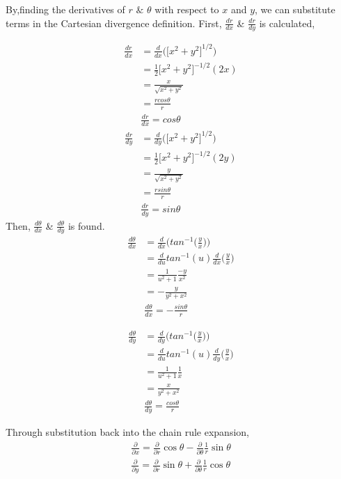 By,finding the derivatives of $r$ $\&$ $\theta$ with respect to $x$ and $y$, we can substitute terms in the Cartesian divergence definition. First, $\frac{dr}{dx}$ \& $\frac{dr}{dy}$ is calculated,

\begin{align*}
 	\frac{dr}{dx}                                      
	&= \frac{d}{dx} \Bigg(\Big[ x^2 + y^2 \Big]^{1/2}\Bigg) \\
	&= \frac{1}{2} \Big[ x^2 + y^2 \Big]^{-1/2} (2x) \\
 	&=	\frac{x}{\sqrt{x^2+y^2}}\\
 	&= \frac{r cos\theta}{r}\\
 	& \boxed{\frac{dr}{dx} = cos\theta} 
\end{align*}
\begin{align*}
	\frac{dr}{d y}
	&= \frac{d}{dy} \Bigg(\Big[ x^2 + y^2 \Big]^{1/2}\Bigg) \\
	&= \frac{1}{2}\Big[x^2 + y^2\Big]^{-1/2}(2y) \\
	&= \frac{y}{\sqrt{x^2+y^2}} \\
	&= \frac{r sin\theta}{r}\\
	& \boxed{\frac{dr}{d y} = sin\theta} 
\end{align*}
Then, $\frac{d\theta}{dx}$ \& $\frac{d\theta}{dy}$ is found.
\begin{align*}
	\frac{d \theta}{d x} 
	&= \frac{d}{dx} \Bigg(tan^{-1} \Big(\frac{y}{x}\Big)\Bigg)  \\
	&= \frac{d}{du}tan^{-1}(u) \frac{d}{dx} \Big( \frac{y}{x} \Big)\\
	&= \frac{1}{u^2  + 1} \frac{-y}{x^2} \\
	&= -\frac{y}{y^2 + x^2} \\
	& \boxed{ \frac{d \theta}{d x} =-\frac{sin \theta}{r}}
\end{align*}

\begin{align*}
	\frac{d \theta}{d y} 
	&= \frac{d}{dy} \Bigg(tan^{-1} \Big(\frac{y}{x}\Big)\Bigg)  \\
	&= \frac{d}{du}tan^{-1}(u) \frac{d}{dy} \Big( \frac{y}{x} \Big)\\
	&= \frac{1}{u^2  + 1} \frac{1}{x} \\
	&= \frac{x}{y^2 + x^2} \\
	& \boxed{\frac{d \theta}{d y}  = \frac{cos \theta}{r}}
\end{align*}

Through substitution back into the chain rule expansion,
\begin{align*}
	\frac{\partial} {\partial x} =
	\frac{\partial} {\partial r} \cos \theta %
	- \frac{\partial} {\partial \theta} \frac{1}{r} \sin \theta \\
	\frac{\partial} {\partial y} =
	\frac{\partial} {\partial r} \sin \theta %
	+ \frac{\partial} {\partial \theta} \frac{1}{r} \cos \theta
\end{align*}
	\[\]
	\[\]

